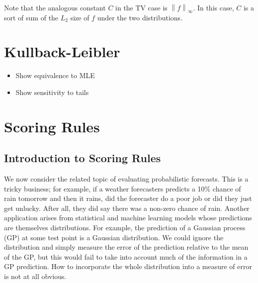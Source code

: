 \documentclass[12pt]{article}
\newcommand*{\norm}[1]{\left\lVert#1\right\rVert}
\begin{document}
Note that the analogous constant $C$ in the TV case is $\norm{f}_\infty$. In this case, $C$ is a sort of sum of the $L_2$ size of $f$ under the two distributions. 




\section{Kullback-Leibler }
\begin{itemize}
\item Show equivalence to MLE
\item Show sensitivity to tails 
\end{itemize}

\section{Scoring Rules}

\subsection{Introduction to Scoring Rules}
We now consider the related topic of evaluating probabilistic forecasts. This is a tricky business; for example, if a weather forecasters predicts a 10\% chance of rain tomorrow and then it rains, did the forecaster do a poor 
job or did they just get unlucky. After all, they did say there was a non-zero chance of rain. Another application arises from statistical and machine learning models whose predictions are themselves distributions. For example, 
the prediction of a Gaussian process (GP) at some test point is a Gaussian distribution. We could ignore the distribution and simply measure the error of the prediction relative to the mean of the GP, but this would fail to take 
into account much of the information in a GP prediction. How to incorporate the whole distribution into a measure of error is not at all obvious. 
\end{document}
